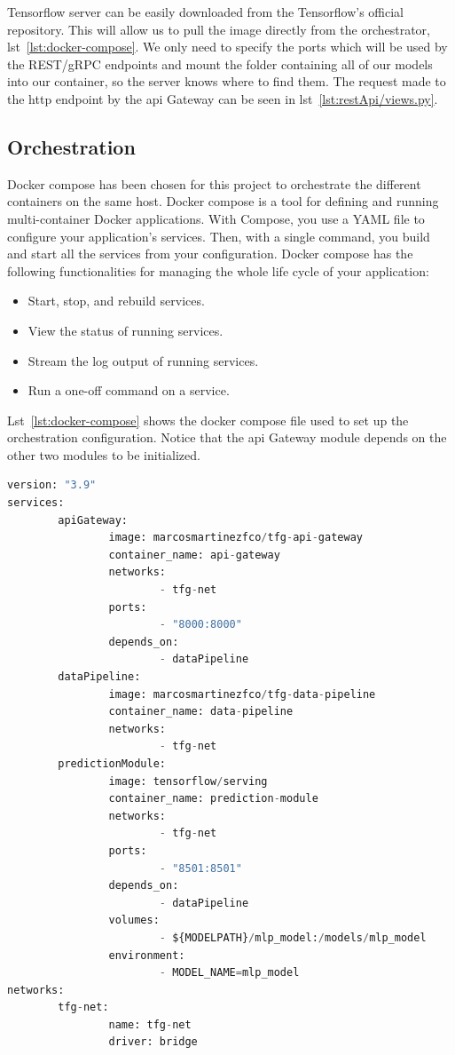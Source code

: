 Tensorflow server can be easily downloaded from the Tensorflow's official repository. This will allow us to pull the image directly from the orchestrator, lst~\ref{lst:docker-compose}. We only need to specify the ports which will be used by the REST/gRPC endpoints and mount the folder containing all of our models into our container, so the server knows where to find them. The request made to the http endpoint by the \gls{api} Gateway can be seen in lst~\ref{lst:restApi/views.py}.

\subsection{Orchestration}

Docker compose has been chosen for this project to orchestrate the different containers on the same host. Docker compose is a tool for defining and running multi-container Docker applications. With Compose, you use a YAML file to configure your application’s services. Then, with a single command, you build and start all the services from your configuration. Docker compose has the following functionalities for managing the whole life cycle of your application:~\cite{dockerCompose}

\begin{itemize}
    \item Start, stop, and rebuild services.
    \item View the status of running services.
    \item Stream the log output of running services.
    \item Run a one-off command on a service.
\end{itemize}

Lst~\ref{lst:docker-compose} shows the docker compose file used to set up the orchestration configuration. Notice that the \gls{api} Gateway module depends on the other two modules to be initialized. 

\newpage
\begin{lstlisting}[language=python,caption=docker-compose.yaml,label={lst:docker-compose}]
version: "3.9"
services:
        apiGateway:
                image: marcosmartinezfco/tfg-api-gateway
                container_name: api-gateway
                networks:
                        - tfg-net
                ports:
                        - "8000:8000"
                depends_on:
                        - dataPipeline
        dataPipeline:
                image: marcosmartinezfco/tfg-data-pipeline
                container_name: data-pipeline
                networks:
                        - tfg-net
        predictionModule:
                image: tensorflow/serving
                container_name: prediction-module
                networks:
                        - tfg-net
                ports:
                        - "8501:8501"
                depends_on:
                        - dataPipeline
                volumes:
                        - ${MODELPATH}/mlp_model:/models/mlp_model
                environment:
                        - MODEL_NAME=mlp_model
networks:
        tfg-net:
                name: tfg-net
                driver: bridge
\end{lstlisting}

